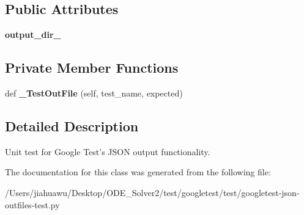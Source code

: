 \subsection*{Public Attributes}
\begin{DoxyCompactItemize}
\item 
\mbox{\label{classgoogletest-json-outfiles-test_1_1_g_test_json_out_files_test_a18e262639002fb485155961593efad20}} 
{\bfseries output\+\_\+dir\+\_\+}
\end{DoxyCompactItemize}
\subsection*{Private Member Functions}
\begin{DoxyCompactItemize}
\item 
\mbox{\label{classgoogletest-json-outfiles-test_1_1_g_test_json_out_files_test_ac8c86b641d2450e0ad17f1154692e7f8}} 
def {\bfseries \+\_\+\+Test\+Out\+File} (self, test\+\_\+name, expected)
\end{DoxyCompactItemize}


\subsection{Detailed Description}
\begin{DoxyVerb}Unit test for Google Test's JSON output functionality.\end{DoxyVerb}
 

The documentation for this class was generated from the following file\+:\begin{DoxyCompactItemize}
\item 
/\+Users/jiahuawu/\+Desktop/\+O\+D\+E\+\_\+\+Solver2/test/googletest/test/googletest-\/json-\/outfiles-\/test.\+py\end{DoxyCompactItemize}
